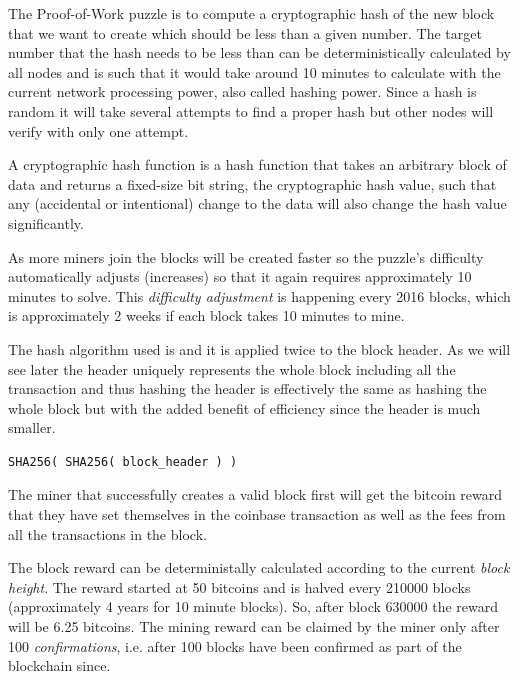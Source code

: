 The Proof-of-Work puzzle is to compute a cryptographic hash of the new block that we want to create which should be less than a given number. The target number that the hash needs to be less than can be deterministically calculated by all nodes and is such that it would take around 10 minutes to calculate with the current network processing power, also called hashing power. Since a hash is random it will take several attempts to find a proper hash but other nodes will verify with only one attempt.

\begin{note}
A cryptographic hash function is a hash function that takes an arbitrary block of data and returns a fixed-size bit string, the cryptographic hash value, such that any (accidental or intentional) change to the data will also change the hash value significantly.
\end{note}

As more miners join the blocks will be created faster so the puzzle’s difficulty automatically adjusts (increases) so that it again requires approximately 10 minutes to solve. This \emph{difficulty adjustment} is happening every 2016 blocks, which is approximately 2 weeks if each block takes 10 minutes to mine.

The hash algorithm used is  and it is applied twice to the block header. As we will see later the header uniquely represents the whole block including all the transaction and thus hashing the header is effectively the same as hashing the whole block but with the added benefit of efficiency since the header is much smaller.

\begin{emphbox}
\begin{lstlisting}[style=Pseudomath]
SHA256( SHA256( block_header ) )
\end{lstlisting}
\end{emphbox}

The miner that successfully creates a valid block first will get the bitcoin reward that they have set themselves in the coinbase transaction as well as the fees from all the transactions in the block.

The block reward can be deterministally calculated according to the current \emph{block height}. The reward started at 50 bitcoins and is halved every 210000 blocks (approximately 4 years for 10 minute blocks). So, after block 630000 the reward will be 6.25 bitcoins. The mining reward can be claimed by the miner only after 100 \emph{confirmations}, i.e. after 100 blocks have been confirmed as part of the blockchain since.


